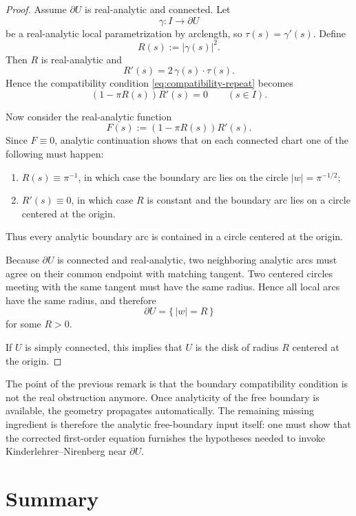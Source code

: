 \documentclass[11pt]{article}
\newcommand{\1}{\mathbf 1}
\begin{document}
\begin{proof}
Assume \(\partial U\) is real-analytic and connected. Let
\[
\gamma:I\to \partial U
\]
be a real-analytic local parametrization by arclength, so \(\tau(s)=\gamma'(s)\). Define
\[
R(s):=|\gamma(s)|^2.
\]
Then \(R\) is real-analytic and
\[
R'(s)=2\,\gamma(s)\cdot \tau(s).
\]
Hence the compatibility condition \eqref{eq:compatibility-repeat} becomes
\[
(1-\pi R(s))R'(s)=0
\qquad (s\in I).
\]

Now consider the real-analytic function
\[
F(s):=(1-\pi R(s))R'(s).
\]
Since \(F\equiv 0\), analytic continuation shows that on each connected chart one of the following
must happen:
\begin{enumerate}[label=\textnormal{(\roman*)}]
\item \(R(s)\equiv \pi^{-1}\), in which case the boundary arc lies on the circle
\(|w|=\pi^{-1/2}\);
\item \(R'(s)\equiv 0\), in which case \(R\) is constant and the boundary arc lies on a circle
centered at the origin.
\end{enumerate}
Thus every analytic boundary arc is contained in a circle centered at the origin.

Because \(\partial U\) is connected and real-analytic, two neighboring analytic arcs must agree
on their common endpoint with matching tangent. Two centered circles meeting with the same tangent
must have the same radius. Hence all local arcs have the same radius, and therefore
\[
\partial U=\{\,|w|=R\,\}
\]
for some \(R>0\).

If \(U\) is simply connected, this implies that \(U\) is the disk of radius \(R\) centered at the
origin.
\end{proof}

The point of the previous remark is that the boundary compatibility condition is not the real
obstruction anymore. Once analyticity of the free boundary is available, the geometry propagates
automatically. The remaining missing ingredient is therefore the analytic free-boundary input
itself: one must show that the corrected first-order equation furnishes the hypotheses needed to
invoke Kinderlehrer--Nirenberg near \(\partial U\).

\section{Summary}
\end{document}
